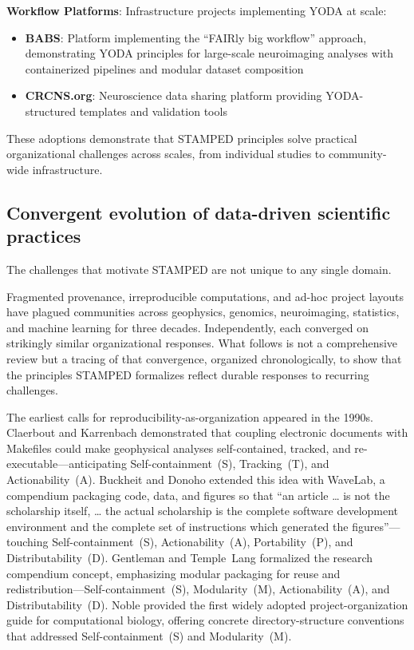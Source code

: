 \documentclass{article}
\makeatletter
\newcommand{\hyanchor}[1]{\texorpdfstring{\Hy@raisedlink{\hypertarget{#1}{}}}{}}
\newcommand{\anchoredsubsection}[2]{\subsection[#2]{\hyanchor{#1}#2}}
\makeatother
\begin{document}
\textbf{Workflow Platforms}: Infrastructure projects implementing YODA at scale:
\begin{itemize}
    \item \textbf{BABS}\cite{zhao_reproducible_2024}: Platform implementing the ``FAIRly big workflow'' approach, demonstrating YODA principles for large-scale neuroimaging analyses with containerized pipelines and modular dataset composition
    \item \textbf{CRCNS.org}: Neuroscience data sharing platform providing YODA-structured templates and validation tools
\end{itemize}

These adoptions demonstrate that STAMPED principles solve practical organizational challenges across scales, from individual studies to community-wide infrastructure.

\anchoredsubsection{convergent-evolution}{Convergent evolution of data-driven scientific practices}

The challenges that motivate STAMPED are not unique to any single domain.

Fragmented provenance, irreproducible computations, and ad-hoc project layouts have plagued communities across geophysics, genomics, neuroimaging, statistics, and machine learning for three decades.
Independently, each converged on strikingly similar organizational responses.
What follows is not a comprehensive review but a tracing of that convergence, organized chronologically, to show that the principles STAMPED formalizes reflect durable responses to recurring challenges.

The earliest calls for reproducibility-as-organization appeared in the 1990s.
Claerbout and Karrenbach\cite{claerbout_electronic_1992} demonstrated that coupling electronic documents with Makefiles could make geophysical analyses self-contained, tracked, and re-executable---anticipating Self-containment~(S), Tracking~(T), and Actionability~(A).
Buckheit and Donoho\cite{bickel_wavelab_1995} extended this idea with WaveLab, a compendium packaging code, data, and figures so that ``an article \ldots{} is not the scholarship itself, \ldots{} the actual scholarship is the complete software development environment and the complete set of instructions which generated the figures''---touching Self-containment~(S), Actionability~(A), Portability~(P), and Distributability~(D).
Gentleman and Temple~Lang\cite{gentleman_statistical_2007} formalized the research compendium concept, emphasizing modular packaging for reuse and redistribution---Self-containment~(S), Modularity~(M), Actionability~(A), and Distributability~(D).
Noble\cite{noble_quick_2009} provided the first widely adopted project-organization guide for computational biology, offering concrete directory-structure conventions that addressed Self-containment~(S) and Modularity~(M).
\end{document}

